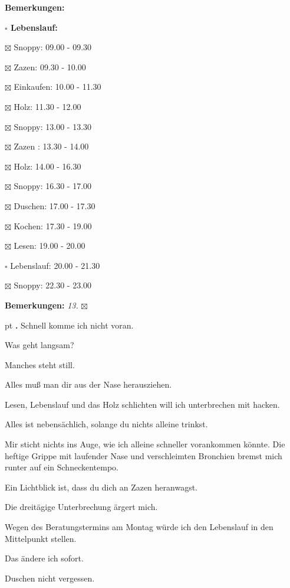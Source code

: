 \documentclass[10pt,a4paper]{article}
\newcounter{notec}
\newcommand\notep[1]{%
  \stepcounter{notec}
  \vskip #1pt
  {\bf\arabic{notec}.}
}
\newcommand\prop[1] {{\color {alizarin} {\bf #1}}}        %
\newcommand\mand[1] {{\color {burntorange} {\bf #1}}}     %
\newcommand\bottomspace{\vskip 4pt}
\newcommand\n[1] { {\sl #1.} \hskip 5pt }
\begin{document}
\begin{mdframed}[style=daystyle]
\begin{labeling}{{\mand {Bemerkungen:}}}
\begin{minipage}{0.75\textwidth}
\begin{labeling}{\prop {$\square$ {Lebenslauf:}}}
        \setlength\itemsep{-3pt}
      \item[$\boxtimes$ Snoppy:]     09.00 - 09.30        
      \item[$\boxtimes$ Zazen:]      09.30 - 10.00        
      \item[$\boxtimes$ Einkaufen:]  10.00 - 11.30        
      \item[$\boxtimes$ Holz:]       11.30 - 12.00
      \item[$\boxtimes$ Snoppy:]     13.00 - 13.30
      \item[$\boxtimes$ Zazen  :]    13.30 - 14.00
      \item[$\boxtimes$ Holz:]       14.00 - 16.30
      \item[$\boxtimes$ Snoppy:]     16.30 - 17.00
      \item[$\boxtimes$ Duschen:]    17.00 - 17.30
      \item[$\boxtimes$ Kochen:]     17.30 - 19.00        
      \item[$\boxtimes$ Lesen:]      19.00 - 20.00        
      \item[$\square$ Lebenslauf:]   20.00 - 21.30        
      \item[$\boxtimes$ Snoppy:]     22.30 - 23.00
      \end{labeling}
    \end{minipage}
    \bottomspace
  \item[{\mand {Bemerkungen:}}]     \n{13} $\boxtimes$
  \end{labeling}
    
  \setcounter{notec}{0}
  
  \notep 0 Schnell komme ich nicht voran.

  \vskip 2pt
  Was geht langsam?

  \vskip 2pt
  Manches steht still.

  \vskip 2pt
  Alles muß man dir aus der Nase herausziehen.

  \vskip 2pt
  Lesen, Lebenslauf und das Holz schlichten will ich unterbrechen mit hacken.

  \vskip 2pt
  Alles ist nebensächlich, solange du nichts alleine trinkst.

  \vskip 2pt
  Mir sticht nichts ins Auge, wie ich alleine schneller vorankommen könnte. Die
  heftige Grippe mit laufender Nase und verschleimten Bronchien bremst mich
  runter auf ein Schneckentempo.

  \vskip 2pt
  Ein Lichtblick ist, dass du dich an Zazen heranwagst.

  \vskip 2pt
  Die dreitägige Unterbrechung ärgert mich.

  \vskip 2pt
  Wegen des Beratungstermins am Montag würde ich den Lebenslauf in den Mittelpunkt stellen.

  \vskip 2pt
  Das ändere ich sofort.

  \vskip 2pt
  Duschen nicht vergessen.

\end{mdframed}
\end{document}
